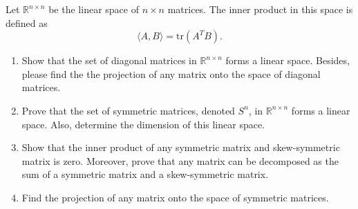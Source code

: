 \documentclass[11pt,letter,notitlepage]{article}
\begin{document}
\newpage
    \begin{exercise}
        Let $\mathbb{R}^{n \times n}$ be the linear space of \(n \times n\) matrices. The inner product in this space is defined as \[ \langle A, B \rangle = \text{tr}(A^T B). \]
                \begin{enumerate}
                    \item Show that the set of diagonal matrices in $\mathbb{R}^{n \times n}$ forms a linear space. Besides, please find the the projection of any matrix onto the space of diagonal matrices.
                
                    \item Prove that the set of symmetric matrices, denoted $S^n$, in $\mathbb{R}^{n \times n}$ forms a linear space. Also, determine the dimension of this linear space.
    
                    \item Show that the inner product of any symmetric matrix and skew-symmetric matrix is zero. Moreover, prove that any matrix can be decomposed as the sum of a symmetric matrix and a skew-symmetric matrix.
    
                    \item Find the projection of any matrix onto the space of symmetric matrices.
                \end{enumerate}
    \end{exercise}
	
\newpage
\end{document}
